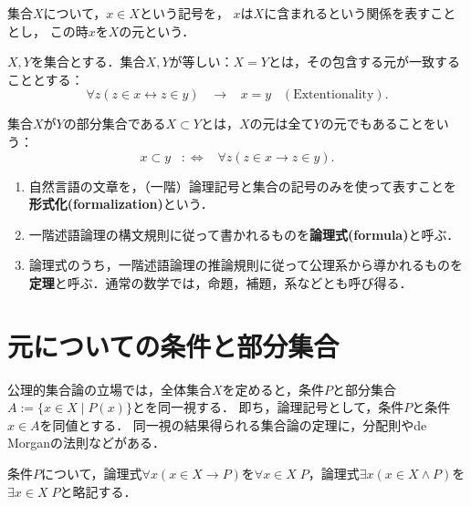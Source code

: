 \documentclass[uplatex,dvipdfmx]{jsreport}
\begin{document}
\begin{axiom}[所属関係$\in$]
    集合$X$について，$x\in X$という記号を，
    $x$は$X$に含まれるという関係を表すこととし，
    この時$x$を$X$の元という．
\end{axiom}

\begin{axiom}[集合の相等]\label{def-Extentionality}
    $X,Y$を集合とする．集合$X,Y$が等しい：$X=Y$とは，その包含する元が一致することとする：\[\forall z(z\in x\leftrightarrow z\in y)\;\;\;\rightarrow\;\;\; x=y \;\;\;\mathrm{(Extentionality)}.\]
\end{axiom}
\begin{definition}[包含関係]
    集合$X$が$Y$の部分集合である$X\subset Y$とは，$X$の元は全て$Y$の元でもあることをいう：\[x\subset y\;\;\;:\Leftrightarrow\;\;\;\forall z(z\in x\rightarrow z\in y).\]
\end{definition}

\begin{definition}[論理の用語]\mbox{}
    \begin{enumerate}
        \item 自然言語の文章を，（一階）論理記号と集合の記号のみを使って表すことを\textbf{形式化(formalization)}という．
        \item 一階述語論理の構文規則に従って書かれるものを\textbf{論理式(formula)}と呼ぶ．
        \item 論理式のうち，一階述語論理の推論規則に従って公理系から導かれるものを\textbf{定理}と呼ぶ．通常の数学では，命題，補題，系などとも呼び得る．
    \end{enumerate}
\end{definition}

\section{元についての条件と部分集合}

\begin{screen}
    公理的集合論の立場では，全体集合$X$を定めると，条件$P$と部分集合$A:=\{x\in X\mid P(x)\}$とを同一視する．
    即ち，論理記号として，条件$P$と条件$x\in A$を同値とする．
    同一視の結果得られる集合論の定理に，分配則やde Morganの法則などがある．
\end{screen}

\begin{notation}
    条件$P$について，論理式$\forall x(x\in X\rightarrow P)$を$\forall x\in X\;P$，論理式$\exists x(x\in X\land P)$を$\exists x\in X\;P$と略記する．
\end{notation}
\end{document}
